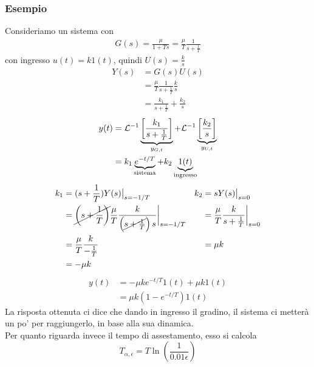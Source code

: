 \documentclass{article}
\numberwithin{equation}{subsection}
\begin{document}
\subsubsection{Esempio}
Consideriamo un sistema con 
\begin{align*}
    G(s) = \frac{\mu}{1+T s} = \frac{\mu}{T} \frac{1}{s+\frac{1}{T}}
\end{align*}
con ingresso $u(t)=k 1(t)$, quindi $U(s) = \frac{k}{s}$
\begin{align*}
    Y(s) 
    &= G(s) U(s)
    \\
    &=  \frac{\mu}{T} \frac{1}{s+\frac{1}{T}} \frac{k}{s}
    \\
    &= \frac{k_1}{s+\frac{1}{T}} + \frac{k_2}{s}
\end{align*}
\begin{align*}
    y(t)
    &= \mathcal{L}^{-1} \underbrace{\left[\frac{k_1}{s+\frac{1}{T}}\right]}_{y_{G,t}} + \mathcal{L}^{-1} \underbrace{\left[\frac{k_2}{s}\right]}_{y_{U,t}}
    \\
    &= k_1 \underbrace{e^{-t/T}}_{\text{sistema}} + k_2 \underbrace{1(t)}_{\text{ingresso}}
\end{align*}
\begin{align*}
    k_1 
    &= (s+\frac{1}{T})Y(s) \big|_{s=-1/T}
    &
    k_2
    &= sY(s) \big|_{s=0}
    \\
    &= \cancel{\left(s+\frac{1}{T}\right)}\frac{\mu}{T}\frac{k}{\left(\cancel{s+\frac{1}{T}}\right)s}\bigg|_{s=-1/T}&
    &=\frac{\mu}{T} \frac{k}{s+\frac{1}{T}} \bigg|_{s=0}
    \\
    &=\frac{\mu}{T} \frac{k}{-\frac{1}{T}}&
    &= \mu k
    \\
    &= -\mu k
\end{align*}
\begin{align*}
    y(t)
    &= - \mu k e^{-t/T}1(t) + \mu k 1(t)
    \\
    &= \mu k (1 - e^{-t/T}) 1(t)
\end{align*}
La risposta ottenuta ci dice che dando in ingresso il gradino, il sistema ci metterà un po' per raggiungerlo, in base alla sua dinamica.
\vspace*{0.1cm}\\
Per quanto riguarda invece il tempo di assestamento, esso si calcola
\[
    T_{\alpha,\epsilon} = T \ln \left(\frac{1}{0.01\epsilon}\right)    
\]
\end{document}
